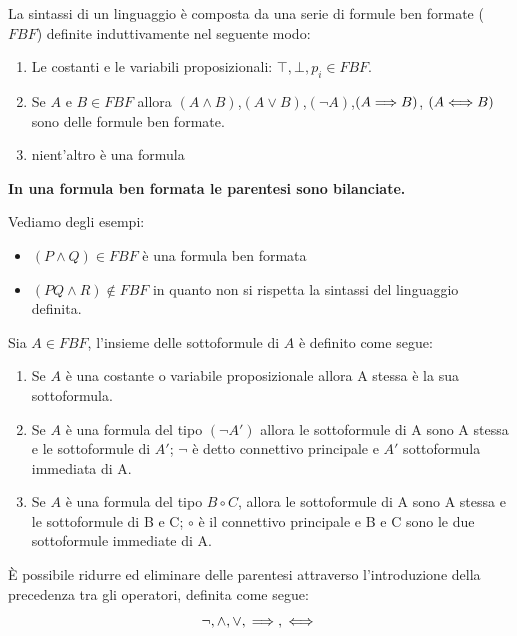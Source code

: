 \documentclass[a4paper,12pt, oneside]{book}
\begin{document}
La sintassi di un linguaggio è composta da una serie di formule ben
formate ($FBF$) definite induttivamente nel seguente modo:
\begin{enumerate}
  \item Le costanti e le variabili proposizionali: $\top,\bot,p_i\in FBF$.
  \item Se $A$ e $B \in FBF$ allora $(A \land B)$,$(A \lor B)$,$(\neg A)$,$(A
  {\implies} B)$, $(A {\iff} B)$ sono delle formule ben formate.
  \item nient'altro è una formula
\end{enumerate}

\textbf{In una formula ben formata le parentesi sono bilanciate.}

\begin{esempio}
  Vediamo degli esempi:
  \begin{itemize}
    \item $(P \land Q) \in FBF$  è una formula ben formata\newline
    \item $(PQ \land R) \not \in FBF$ in quanto non si rispetta la sintassi del
    linguaggio 
    definita. 
  \end{itemize}
\end{esempio}

\begin{definizione}

  Sia $A \in FBF$, l'insieme delle sottoformule di $A$ è definito come segue:
  \begin{enumerate}
    \item Se $A$ è una costante o variabile proposizionale allora A stessa è la
    sua 
    sottoformula.
    \item Se $A$ è una formula del tipo $(\neg A')$ allora le sottoformule di A
    sono 
    A stessa e le sottoformule di $A'$; 
    $\neg$ è detto connettivo principale e $A'$ sottoformula immediata di A.
    \item Se $A$ è una formula del tipo $B \circ C$, allora le sottoformule di A
    sono A stessa 
    e le sottoformule di B e C; $\circ$ è il connettivo principale e B e C sono
    le due sottoformule immediate di A. 
  \end{enumerate}

\end{definizione}
È possibile ridurre ed eliminare delle parentesi attraverso l'introduzione della
precedenza tra gli operatori, definita come segue: 
$$
\neg, \land, \lor, {\implies},{\iff}
$$
\end{document}
